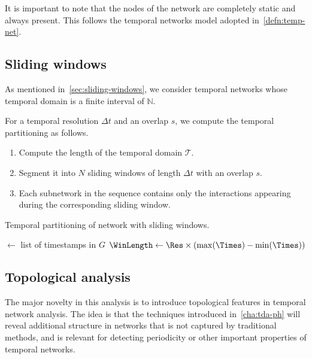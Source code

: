 \documentclass[a4paper,11pt,openany,extrafontsizes]{memoir}
\begin{document}
It is important to note that the nodes of the network are completely
static and always present. This follows the temporal networks model
adopted in~\autoref{defn:temp-net}.

\subsection{Sliding windows}%
\label{sec:sliding-windows-1}

As mentioned in~\autoref{sec:sliding-windows}, we consider temporal
networks whose temporal domain is a finite interval of $\mathbb{N}$.

For a temporal resolution $\Delta t$ and an overlap $s$, we compute
the temporal partitioning as follows.
\begin{enumerate}
\item Compute the length of the temporal domain $\mathcal{T}$.
\item Segment it into $N$ sliding windows of length $\Delta t$ with an
  overlap $s$.
\item Each subnetwork in the sequence contains only the interactions
  appearing during the corresponding sliding window.
\end{enumerate}

\begin{algorithm}[ht]
  \caption{Temporal partitioning of network with sliding
    windows.}\label{algo:partitioning}
  \DontPrintSemicolon%
  \Times$\leftarrow$ list of timestamps in $G$\;
  $\WinLength\leftarrow\Res\times (\max(\Times) - \min(\Times))$\;
\end{algorithm}

\subsection{Topological analysis}%
\label{sec:topological-analysis}

The major novelty in this analysis is to introduce topological
features in temporal network analysis. The idea is that the techniques
introduced in~\autoref{cha:tda-ph} will reveal additional structure in
networks that is not captured by traditional methods, and is relevant
for detecting periodicity or other important properties of temporal
networks.
\end{document}
